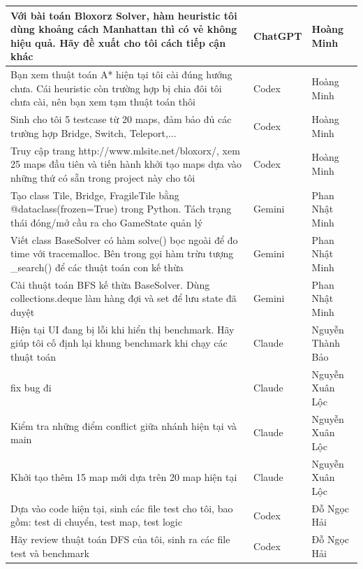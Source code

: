 \begin{longtable}{|>{\raggedright\arraybackslash}p{7.5cm}|l|l|}
    Với bài toán Bloxorz Solver, hàm heuristic tôi dùng khoảng cách Manhattan thì có vẻ không hiệu quả. Hãy đề xuất cho tôi cách tiếp cận khác & ChatGPT & Hoàng Minh \\
    \hline
    Bạn xem thuật toán A* hiện tại tôi cài đúng hướng chưa. Cái heuristic còn trường hợp bị chia đôi tôi chưa cài, nên bạn xem tạm thuật toán thôi & Codex & Hoàng Minh \\
    \hline
    Sinh cho tôi 5 testcase từ 20 maps, đảm bảo đủ các trường hợp Bridge, Switch, Teleport,... & Codex & Hoàng Minh \\
    \hline
    Truy cập trang http://www.mlsite.net/bloxorx/, xem 25 maps đầu tiên và tiến hành khởi tạo maps dựa vào những thứ có sẵn trong project này cho tôi & Codex & Hoàng Minh \\
    \hline
    Tạo class Tile, Bridge, FragileTile bằng @dataclass(frozen=True) trong Python. Tách trạng thái đóng/mở cầu ra cho GameState quản lý & Gemini & Phan Nhật Minh \\
    \hline
    Viết class BaseSolver có hàm solve() bọc ngoài để đo time với tracemalloc. Bên trong gọi hàm trừu tượng \_search() để các thuật toán con kế thừa & Gemini & Phan Nhật Minh \\
    \hline
    Cài thuật toán BFS kế thừa BaseSolver. Dùng collections.deque làm hàng đợi và set để lưu state đã duyệt & Gemini & Phan Nhật Minh \\
    \hline
    Hiện tại UI đang bị lỗi khi hiển thị benchmark. Hãy giúp tôi cố định lại khung benchmark khi chạy các thuật toán & Claude & Nguyễn Thành Bảo \\
    \hline
    fix bug đi & Claude & Nguyễn Xuân Lộc \\
    \hline
    Kiểm tra những điểm conflict giữa nhánh hiện tại và main & Claude & Nguyễn Xuân Lộc \\
    \hline
    Khởi tạo thêm 15 map mới dựa trên 20 map hiện tại & Claude & Nguyễn Xuân Lộc \\
    \hline
    Dựa vào code hiện tại, sinh các file test cho tôi, bao gồm: test di chuyển, test map, test logic & Codex & Đỗ Ngọc Hải \\ 
    \hline
    Hãy review thuật toán DFS của tôi, sinh ra các file test và benchmark & Codex & Đỗ Ngọc Hải \\


\end{longtable}